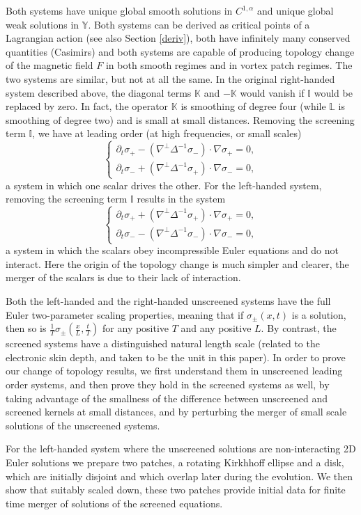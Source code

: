 \documentclass[11pt,reqno]{amsproc}
\newcommand{\pa}{\partial}
\newcommand{\la}{\label}
\newcommand{\fr}{\frac}
\newcommand{\na}{\nabla}
\newcommand{\be}{\begin{equation}}
\newcommand{\ee}{\end{equation}}
\newcommand{\ba}{\begin{array}{l}}
\newcommand{\ea}{\end{array}}
\begin{document}
Both systems have unique global smooth solutions in $C^{1,\alpha}$ and unique global weak solutions in $\mathbb Y$. Both systems can be derived as critical points of a Lagrangian action \cite{morrison} (see also Section \ref{deriv}), both have infinitely many conserved quantities (Casimirs) and both systems are capable of producing  topology change of the magnetic field $F$ in both smooth regimes and in vortex patch regimes. The two systems are similar, but not at all the same. In the original right-handed system described above, the diagonal terms $\mathbb K$ and $-{\mathbb K}$ would vanish if $\mathbb I$ would be replaced by zero. In fact, the operator $\mathbb K$ is smoothing of degree four (while $\mathbb L$ is smoothing of degree two) and  is small at small distances. Removing the screening term $\mathbb I$, we have at leading order  (at  high frequencies, or small scales) 
\be
\left\{
\ba
\pa_t\sigma_{+}  - (\na^{\perp}\Delta^{-1}\sigma_-)\cdot\na \sigma_+ = 0,\\
\pa_t\sigma_{-} + (\na^{\perp}\Delta^{-1}\sigma_+)\cdot\na\sigma_- = 0,
\ea
\right.
\la{right}
\ee
a system in which one scalar drives the other.  For the left-handed system, removing the screening term
$\mathbb I$ results in the system
\be
\left\{
\ba
\pa_t\sigma_{+}  +(\na^{\perp}\Delta^{-1}\sigma_+)\cdot\na \sigma_+ = 0,\\
\pa_t\sigma_{-}  - (\na^{\perp}\Delta^{-1}\sigma_-)\cdot\na\sigma_- = 0,
\ea
\right.
\la{left}
\ee
a system in which the scalars obey incompressible Euler equations and do not interact. Here the origin of the
topology change is much simpler and clearer, the merger of the scalars is due to their lack of interaction.


Both the left-handed and the right-handed unscreened systems have the full Euler two-parameter scaling properties, meaning that if $\sigma_{\pm}(x,t)$ is a solution, then so is $\fr{1}{T}\sigma_{\pm}\left(\fr{x}{L}, \fr{t}{T}\right)$ for any positive $T$ and any positive $L$. By contrast, the screened systems have a distinguished natural length scale (related to the electronic skin depth, and taken to be the unit in this paper). In order to prove our change of topology results, we first understand them in unscreened leading order systems, and then prove they hold in the screened systems as well, by taking advantage of the smallness of the difference between unscreened and screened kernels at small distances, and by perturbing the merger of small scale solutions of the unscreened systems.

For the left-handed system where the unscreened solutions are non-interacting 2D Euler solutions we prepare two patches, a rotating Kirkhhoff ellipse and a disk, which are initially disjoint and which overlap later during the evolution. We then show that suitably scaled down, these two patches provide initial data for finite time merger of solutions of the screened equations.   
\end{document}
